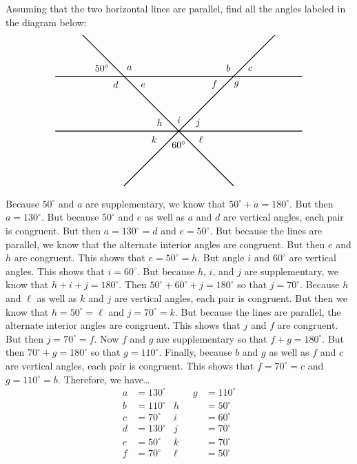 \documentclass[11pt,letterpaper]{article}
\begin{document}
 Assuming that the two horizontal lines are parallel, find all the angles labeled in the diagram below:
	\[
	\begin{tikzpicture}
	\draw[line width=0.03cm] (-4.5,2) -- (4.5,2);
	\draw[line width=0.03cm] (-4.5,0) -- (4.5,0);
	\draw[line width=0.03cm] (-2,-2) -- (3.5,3.5);
	\draw[line width=0.03cm] (-3.5,3.5) -- (2,-2);
	\node at (-2.8,2.3) {$50^\circ$};
	\node at (-1.8,2.3) {$a$};
	\node at (1.8,2.3) {$b$};
	\node at (2.6,2.27) {$c$};
	\node at (-2.3,1.7) {$d$};
	\node at (-1.3,1.67) {$e$};
	\node at (1.3,1.7) {$f$};
	\node at (2.1,1.7) {$g$};
	\node at (-0.7,0.3) {$h$};
	\node at (0,0.4) {$i$};
	\node at (0.7,0.3) {$j$};
	\node at (-0.9,-0.3) {$k$};
	\node at (0,-0.5) {$60^\circ$};
	\node at (0.8,-0.3) {$\ell$};
	\end{tikzpicture}
	\] \pspace

\sol Because $50^\circ$ and $a$ are supplementary, we know that $50^\circ + a= 180^\circ$. But then $a= 130^\circ$. But because $50^\circ$ and $e$ as well as $a$ and $d$ are vertical angles, each pair is congruent. But then $a= 130^\circ= d$ and $e= 50^\circ$. But because the lines are parallel, we know that the alternate interior angles are congruent. But then $e$ and $h$ are congruent. This shows that $e= 50^\circ= h$. But angle $i$ and $60^\circ$ are vertical angles. This shows that $i= 60^\circ$. But because $h$, $i$, and $j$ are supplementary, we know that $h + i + j= 180^\circ$. Then $50^\circ + 60^\circ + j= 180^\circ$ so that $j= 70^\circ$. Because $h$ and $\ell$ as well as $k$ and $j$ are vertical angles, each pair is congruent. But then we know that $h= 50^\circ= \ell$ and $j= 70^\circ= k$. But because the lines are parallel, the alternate interior angles are congruent. This shows that $j$ and $f$ are congruent. But then $j= 70^\circ= f$. Now $f$ and $g$ are supplementary so that $f + g= 180^\circ$. But then $70^\circ + g= 180^\circ$ so that $g= 110^\circ$. Finally, because $b$ and $g$ as well as $f$ and $c$ are vertical angles, each pair is congruent. This shows that $f= 70^\circ= c$ and $g= 110^\circ= b$. Therefore, we have\dots \pspace
	\[
	\begin{aligned}
	a&= 130^\circ &\qquad g&= 110^\circ \\[0.3cm]
	b&= 110^\circ & h&= 50^\circ \\[0.3cm]
	c&= 70^\circ & i&= 60^\circ \\[0.3cm]
	d&= 130^\circ & j&= 70^\circ \\[0.3cm]
	e&= 50^\circ & k&= 70^\circ \\[0.3cm]
	f&= 70^\circ & \ell&= 50^\circ
	\end{aligned}
	\]
\end{document}
